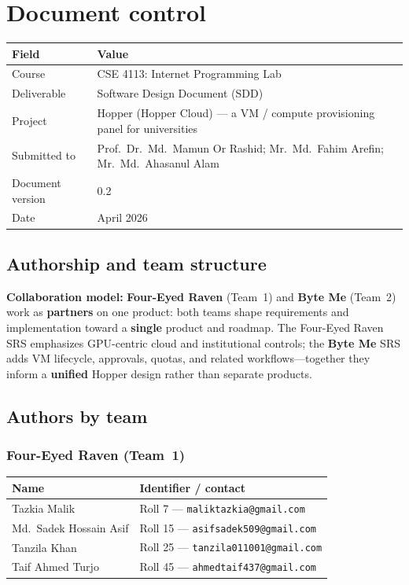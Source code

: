 \documentclass[12pt,a4paper]{article}
\newcommand{\ByteMeHeading}{Byte Me}
\newcommand{\ByteMe}{%
  \texorpdfstring{\textbf{\ByteMeHeading}}{Byte Me}%
}
\begin{document}
\tableofcontents
\newpage

\section{Document control}
\label{sec:doc-control}

\begin{tabularx}{\textwidth}{@{}L{3.2cm}X@{}}
  \toprule
  \textbf{Field} & \textbf{Value} \\
  \midrule
  Course & CSE 4113: Internet Programming Lab \\
  Deliverable & Software Design Document (SDD) \\
  Project & Hopper (Hopper Cloud) --- a VM / compute provisioning panel for universities \\
  Submitted to & Prof.\ Dr.\ Md.\ Mamun Or Rashid; Mr.\ Md.\ Fahim Arefin; Mr.\ Md.\ Ahasanul Alam \\
  Document version & 0.2 \\
  Date & April 2026 \\
  \bottomrule
\end{tabularx}

\subsection{Authorship and team structure}
\textbf{Collaboration model:} \textbf{Four-Eyed Raven} (Team~1) and \ByteMe{} (Team~2) work as \textbf{partners} on one product: both teams shape requirements and implementation toward a \textbf{single} product and roadmap. The Four-Eyed Raven SRS emphasizes GPU-centric cloud and institutional controls; the \ByteMe{} SRS adds VM lifecycle, approvals, quotas, and related workflows---together they inform a \textbf{unified} Hopper design rather than separate products.

\subsection{Authors by team}

\subsubsection*{Four-Eyed Raven (Team~1)}
\begin{tabularx}{\textwidth}{@{}L{4.5cm}X@{}}
  \toprule
  \textbf{Name} & \textbf{Identifier / contact} \\
  \midrule
  Tazkia Malik & Roll 7 --- \texttt{maliktazkia@gmail.com} \\
  Md.\ Sadek Hossain Asif & Roll 15 --- \texttt{asifsadek509@gmail.com} \\
  Tanzila Khan & Roll 25 --- \texttt{tanzila011001@gmail.com} \\
  Taif Ahmed Turjo & Roll 45 --- \texttt{ahmedtaif437@gmail.com} \\
  \bottomrule
\end{tabularx}
\end{document}
